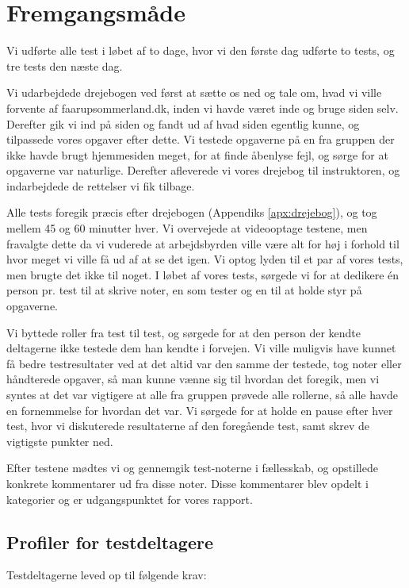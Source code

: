 \documentclass[10pt,a4paper]{article}      %
\begin{document}
\section{Fremgangsmåde}

Vi udførte alle test i løbet af to dage, hvor vi den første dag udførte to
tests, og tre tests den næste dag.

Vi udarbejdede drejebogen ved først at sætte os ned og tale om, hvad vi ville
forvente af faarupsommerland.dk, inden vi havde været inde og bruge siden selv.
Derefter gik vi ind på siden og fandt ud af hvad siden egentlig kunne, og
tilpassede vores opgaver efter dette. Vi testede opgaverne på en fra gruppen der
ikke havde brugt hjemmesiden meget, for at finde åbenlyse fejl, og sørge for at
opgaverne var naturlige. Derefter afleverede vi vores drejebog til instruktoren,
og indarbejdede de rettelser vi fik tilbage.

Alle tests foregik præcis efter drejebogen (Appendiks \ref{apx:drejebog}), og
tog mellem 45 og 60 minutter hver.  Vi overvejede at videooptage testene, men
fravalgte dette da vi vuderede at arbejdsbyrden ville være alt for høj i forhold
til hvor meget vi ville få ud af at se det igen. Vi optog lyden til et par af
vores tests, men brugte det ikke til noget.  I løbet af vores tests, sørgede vi
for at dedikere én person pr. test til at skrive noter, en som tester og en til
at holde styr på opgaverne.

Vi byttede roller fra test til test, og sørgede for at den person der kendte
deltagerne ikke testede dem han kendte i forvejen. Vi ville muligvis have kunnet
få bedre testresultater ved at det altid var den samme der testede, tog noter
eller håndterede opgaver, så man kunne vænne sig til hvordan det foregik, men vi
syntes at det var vigtigere at alle fra gruppen prøvede alle rollerne, så alle
havde en fornemmelse for hvordan det var.  Vi sørgede for at holde en pause
efter hver test, hvor vi diskuterede resultaterne af den foregående test, samt
skrev de vigtigste punkter ned. 

Efter testene mødtes vi og gennemgik test-noterne i fællesskab, og opstillede
konkrete kommentarer ud fra disse noter. Disse kommentarer blev opdelt i
kategorier og er udgangspunktet for vores rapport.

\subsection{Profiler for testdeltagere}

Testdeltagerne leved op til følgende krav:
\end{document}
